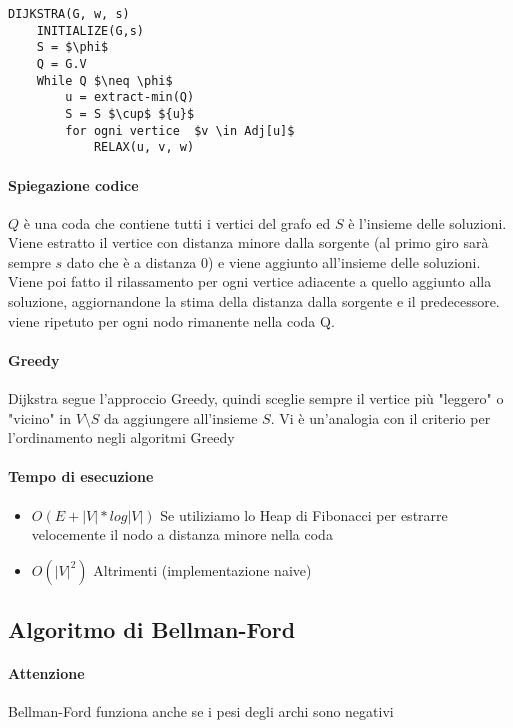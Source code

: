 \documentclass[12pt, a4paper, openany]{book}
\begin{document}
\begin{lstlisting}
DIJKSTRA(G, w, s)
    INITIALIZE(G,s)
    S = $\phi$
    Q = G.V
    While Q $\neq \phi$
        u = extract-min(Q)
        S = S $\cup$ ${u}$
        for ogni vertice  $v \in Adj[u]$ 
            RELAX(u, v, w)
\end{lstlisting}

	\paragraph{Spiegazione codice}
	$Q$ è una coda che contiene tutti i vertici del grafo ed $S$ è l'insieme delle soluzioni.
	Viene estratto il vertice con distanza minore dalla sorgente (al primo giro sarà sempre $s$ dato che è
	a distanza 0) e viene aggiunto all'insieme delle soluzioni. Viene poi fatto il rilassamento per ogni vertice adiacente
	a quello aggiunto alla soluzione, aggiornandone la stima della distanza dalla sorgente e il predecessore.
	viene ripetuto per ogni nodo rimanente nella coda Q.

	\paragraph{Greedy}
	Dijkstra segue l'approccio Greedy, quindi sceglie sempre il vertice più "leggero" o "vicino" in $V \setminus  S$
	da aggiungere all'insieme $S$. Vi è un'analogia con il criterio per l'ordinamento negli algoritmi Greedy

	\paragraph{Tempo di esecuzione}
	\begin{itemize}
		\item $O(E + |V|*log|V|)$ Se utiliziamo lo Heap di Fibonacci per estrarre velocemente il nodo a distanza minore nella coda
		\item $O(|V|^2)$ Altrimenti (implementazione naive)
	\end{itemize}

	\subsection{Algoritmo di Bellman-Ford}

	\paragraph{Attenzione}
	Bellman-Ford funziona anche se i pesi degli archi sono negativi
\end{document}
